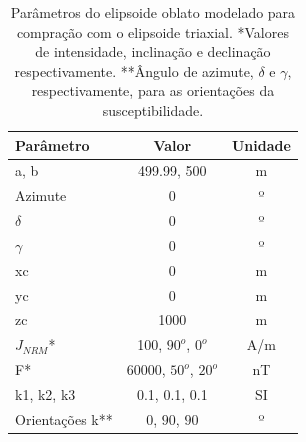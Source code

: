 \begin{table}[h!]
	\begin{center}
		\begin{tabular}{|l|c|c|}
			\hline
			\textbf{Parâmetro}  & \textbf{Valor} & \textbf{Unidade} \\
			\hline 
			a, b   & 499.99, 500 & m\\
			\hline
			Azimute   & $0$ & º\\
			\hline
			$\delta$    & $0$ & º\\
			\hline
			$\gamma$   & $0$  & º\\
			\hline
			xc   & 0  & m\\
			\hline          
			yc   & 0  & m\\
			\hline                
			zc   & 1000  & m\\
			\hline
			$J_{NRM}$*  & 100, $90^o$, $0^o$  & A/m\\
			\hline
			F*    & 60000, $50^o$, $20^o$ & nT \\
			\hline
			k1, k2, k3   & 0.1, 0.1, 0.1 & SI \\
			\hline
			Orientações k**   & $0$, $90$, $90$ & º \\
			\hline
		\end{tabular}
		\caption{Parâmetros do elipsoide oblato modelado para compração com o elipsoide triaxial. *Valores de intensidade, inclinação e declinação respectivamente. **Ângulo de azimute, $\delta$ e $\gamma$, respectivamente, para as orientações da susceptibilidade.}
	\end{center}
	\label{tab:triaxial_oblate2}
\end{table}

